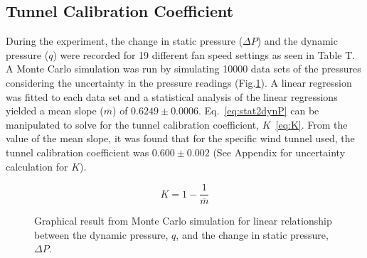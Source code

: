 \documentclass[journal,letterpaper]{IEEEtran}
\begin{document}
\subsection{Tunnel Calibration Coefficient}

During the experiment, the change in static pressure ($\Delta P$) and the dynamic pressure ($q$) were recorded for 19 different fan speed settings as seen in Table T.
A Monte Carlo simulation was run by simulating 10000 data sets of the pressures considering the uncertainty in the pressure readings (Fig.\ref{fig:Monte}).
A linear regression was fitted to each data set and a statistical analysis of the linear regressions yielded a mean slope ($\overline{m}$) of $0.6249 \pm 0.0006$.
Eq.~\eqref{eq:stat2dynP} can be manipulated to solve for the tunnel calibration coefficient, $K$~\eqref{eq:K}.
From the value of the mean slope, it was found that for the specific wind tunnel used, the tunnel calibration coefficient was $0.600 \pm 0.002$ (See Appendix for uncertainty calculation for $K$).

\begin{equation} \label{eq:K}
    K = 1 - \frac{1}{\overline{m}}
\end{equation}

\begin{figure}[H]
    \centering
    
    \caption{Graphical result from Monte Carlo simulation for linear relationship between the dynamic pressure, $q$, and the change in static pressure, $\Delta P$.}
    \label{fig:Monte}
\end{figure}
\end{document}
